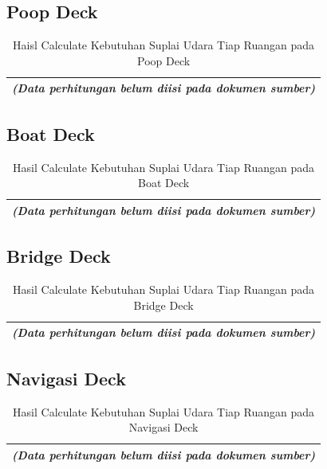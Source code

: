 \documentclass[12pt,a4paper,twoside,openright]{book}
\theoremstyle{definition}
\theoremstyle{plain}
\theoremstyle{remark}
\begin{document}
\subsection{Poop Deck}

\begin{table}[H]
\centering
\caption{Haisl Calculate Kebutuhan Suplai Udara Tiap Ruangan pada Poop Deck}
\begin{tabular}{|c|}
\hline
\textit{(Data perhitungan belum diisi pada dokumen sumber)} \\
\hline
\end{tabular}
\end{table}

\subsection{Boat Deck}

\begin{table}[H]
\centering
\caption{Hasil Calculate Kebutuhan Suplai Udara Tiap Ruangan pada Boat Deck}
\begin{tabular}{|c|}
\hline
\textit{(Data perhitungan belum diisi pada dokumen sumber)} \\
\hline
\end{tabular}
\end{table}

\subsection{Bridge Deck}

\begin{table}[H]
\centering
\caption{Hasil Calculate Kebutuhan Suplai Udara Tiap Ruangan pada Bridge Deck}
\begin{tabular}{|c|}
\hline
\textit{(Data perhitungan belum diisi pada dokumen sumber)} \\
\hline
\end{tabular}
\end{table}

\subsection{Navigasi Deck}

\begin{table}[H]
\centering
\caption{Hasil Calculate Kebutuhan Suplai Udara Tiap Ruangan pada Navigasi Deck}
\begin{tabular}{|c|}
\hline
\textit{(Data perhitungan belum diisi pada dokumen sumber)} \\
\hline
\end{tabular}
\end{table}
\end{document}
